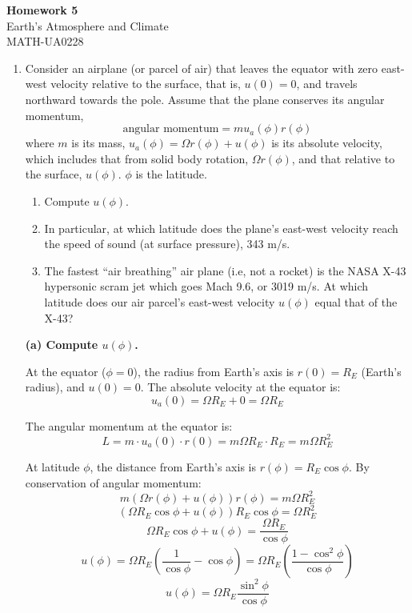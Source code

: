 \documentclass[letterpaper, 11pt]{article}
\newcommand{\1}{\mathds{1}}	%
\theoremstyle{definition}
\begin{document}
\begin{center}
\Large\textbf{Homework 5} \\[0.5em]
\large Earth's Atmosphere and Climate \\
MATH-UA0228
\end{center}

\bigskip

\begin{enumerate}

\item Consider an airplane (or parcel of air) that leaves the equator with zero east-west velocity relative to the surface, that is, $u(0) = 0$, and travels northward towards the pole. Assume that the plane conserves its angular momentum,
\[
\text{angular momentum} = m u_a(\phi) r(\phi)
\]
where $m$ is its mass, $u_a(\phi) = \Omega r(\phi) + u(\phi)$ is its absolute velocity, which includes that from solid body rotation, $\Omega r(\phi)$, and that relative to the surface, $u(\phi)$. $\phi$ is the latitude.

\begin{enumerate}[label=(\alph*)]
\item Compute $u(\phi)$.
\item In particular, at which latitude does the plane's east-west velocity reach the speed of sound (at surface pressure), 343 m/s.
\item The fastest ``air breathing'' air plane (i.e, not a rocket) is the NASA X-43 hypersonic scram jet which goes Mach 9.6, or 3019 m/s. At which latitude does our air parcel's east-west velocity $u(\phi)$ equal that of the X-43?
\end{enumerate}
\textbf{(a) Compute $u(\phi)$.}

At the equator ($\phi = 0$), the radius from Earth's axis is $r(0) = R_E$ (Earth's radius), and $u(0) = 0$. The absolute velocity at the equator is:
\[
u_a(0) = \Omega R_E + 0 = \Omega R_E
\]

The angular momentum at the equator is:
\[
L = m \cdot u_a(0) \cdot r(0) = m \Omega R_E \cdot R_E = m \Omega R_E^2
\]

At latitude $\phi$, the distance from Earth's axis is $r(\phi) = R_E \cos\phi$. By conservation of angular momentum:
\[
m(\Omega r(\phi) + u(\phi)) r(\phi) = m \Omega R_E^2
\]
\[
(\Omega R_E \cos\phi + u(\phi)) R_E \cos\phi = \Omega R_E^2
\]
\[
\Omega R_E \cos\phi + u(\phi) = \frac{\Omega R_E}{\cos\phi}
\]
\[
u(\phi) = \Omega R_E \left(\frac{1}{\cos\phi} - \cos\phi\right) = \Omega R_E \left(\frac{1 - \cos^2\phi}{\cos\phi}\right)
\]
\[
{u(\phi) = \Omega R_E \frac{\sin^2\phi}{\cos\phi}}
\]


\end{enumerate}
\end{document}
